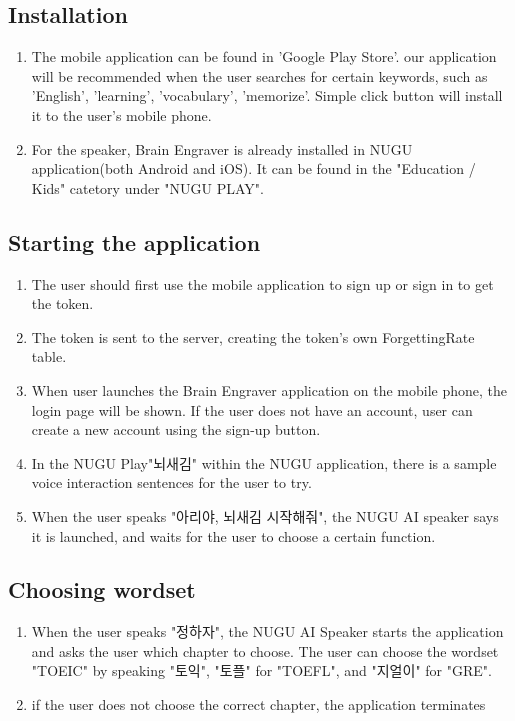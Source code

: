 \documentclass[conference]{IEEEtran}
\begin{document}
    \subsection{Installation}
        \begin{enumerate}
            \item The mobile application can be found in 'Google Play Store'. our application will be recommended when the user searches for certain keywords, such as 'English', 'learning', 'vocabulary', 'memorize'. Simple click button will install it to the user's mobile phone. 
            \item For the speaker, Brain Engraver is already installed in NUGU application(both Android and iOS). It can be found in the "Education / Kids" catetory under "NUGU PLAY".
        \end{enumerate}
    \subsection{Starting the application}
        \begin{enumerate}
            \item The user should first use the mobile application to sign up or sign in to get the token.
            \item The token is sent to the server, creating the token's own ForgettingRate table.
            \item When user launches the Brain Engraver application on the mobile phone, the login page will be shown. If the user does not have an account, user can create a new account using the sign-up button.
            \item In the NUGU Play"뇌새김" within the NUGU application, there is a sample voice interaction sentences for the user to try.
            \item When the user speaks "아리야, 뇌새김 시작해줘", the NUGU AI speaker says it is launched, and waits for the user to choose a certain function.
        \end{enumerate}
    \subsection{Choosing wordset}
        \begin{enumerate}
            \item When the user speaks "정하자", the NUGU AI Speaker starts the application and asks the user which chapter to choose. The user can choose the wordset "TOEIC" by speaking "토익", "토플" for "TOEFL", and "지얼이" for "GRE".
            \item if the user does not choose the correct chapter, the application terminates
        \end{enumerate}
\end{document}
